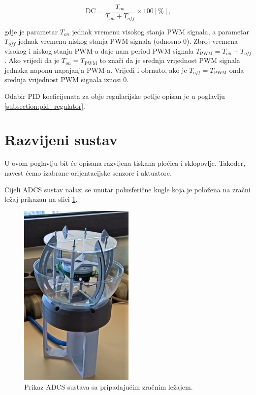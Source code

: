 \documentclass[times, utf8, diplomski, numeric]{templates/template}
\begin{document}
{{{{                \begin{equation}
                    \text{DC} = \frac{T_{on}}{T_{on} + T_{off}} \times 100 \left[ \% \right],
                \end{equation}

                gdje je parametar $T_{on}$ jednak vremenu visokog stanja PWM signala, a parametar $T_{off}$ jednak vremenu niskog stanja PWM signala (odnosno 0). Zbroj vremena visokog i niskog stanja PWM-a daje nam period PWM signala $T_{\text{PWM}} = T_{on} + T_{off}$. Ako vrijedi da je $T_{on}=T_{\text{PWM}}$ to znači da je srednja vrijednost PWM signala jednaka naponu napajanja PWM-a. Vrijedi i obrnuto, ako je $T_{off}=T_{\text{PWM}}$ onda srednja vrijednost PWM signala iznosi 0.

                Odabir PID koeficijenata za obje regulacijske petlje opisan je u poglavlju \ref{subsection:pid_regulator}.
            }
        }
    }

    \section{Razvijeni sustav}{
        U ovom poglavlju bit će opisana razvijena tiskana pločica i sklopovlje. Također, navest ćemo izabrane orijentacijske senzore i aktuatore.

        Cijeli ADCS sustav nalazi se unutar polusferične kugle koja je položena na zračni ležaj prikazan na slici \ref{fig:slika_sustava}.

        \begin{figure}[htb]
        \centering
        \includegraphics[width=0.5\textwidth]{images/slika_sustava.png}
        \caption{Prikaz ADCS sustava sa pripadajućim zračnim ležajem.}
        \label{fig:slika_sustava}
        \end{figure}

}}
\end{document}
